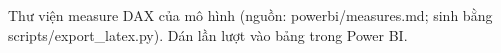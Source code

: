 Thư viện measure DAX của mô hình (nguồn: powerbi/measures.md; sinh bằng scripts/export\_latex.py). Dán lần lượt vào bảng  trong Power BI.

